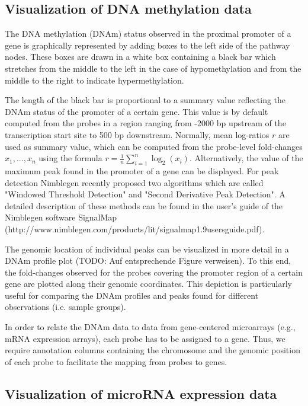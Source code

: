 \documentclass{bioinfo}
\begin{document}
\subsection{Visualization of DNA methylation data}

The DNA methylation (DNAm) status observed in the proximal promoter of a gene is graphically
represented by adding boxes to the left side of the pathway nodes. These boxes are drawn in a white
box containing a black bar which stretches from the middle to the left in the case of
hypomethylation and from the middle to the right to indicate hypermethylation.

The length of the black bar is proportional to a summary value reflecting the DNAm status of the
promoter of a certain gene.  This value is by default computed from the probes in a region ranging
from -2000 bp upstream of the transcription start site to 500 bp downstream. Normally, mean
log-ratios $r$ are used as summary value, which can be computed from the probe-level fold-changes
$x_1,...,x_n$ using the formula $r=\frac{1}{n}\sum\limits_{i=1}^n\log_2(x_i)$. Alternatively, the
value of the maximum peak found in the promoter of a gene can be displayed. For peak detection
Nimblegen recently proposed two algorithms which are called "Windowed Threshold Detection" and
"Second Derivative Peak Detection". A detailed description of these methods can be found in the
user's guide of the Nimblegen software SignalMap
(http://www.nimblegen.com/products/lit/signalmap1.9usersguide.pdf).

The genomic location of individual peaks can be visualized in more detail in a DNAm profile plot
(TODO: Auf entsprechende Figure verweisen).  To this end, the fold-changes observed for the probes
covering the promoter region of a certain gene are plotted along their genomic coordinates. This
depiction is particularly useful for comparing the DNAm profiles and peaks found for different
observations (i.e. sample groups).

In order to relate the DNAm data to data from gene-centered microarrays (e.g., mRNA expression
arrays), each probe has to be assigned to a gene. Thus, we require annotation columns containing the
chromosome and the genomic position of each probe to facilitate the mapping from probes to genes.


\subsection{Visualization of microRNA expression data}
\end{document}
